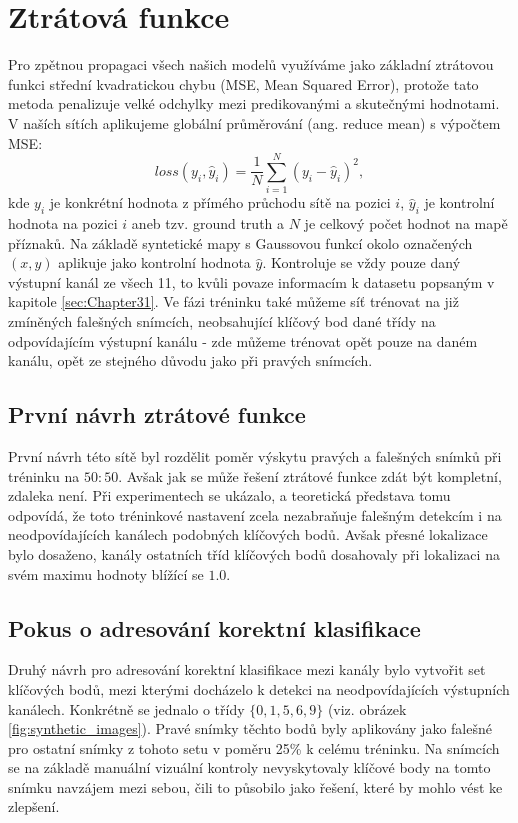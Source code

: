 \section{Ztrátová funkce}
\label{sec:Chapter47}
Pro zpětnou propagaci všech našich modelů využíváme jako základní ztrátovou funkci střední kvadratickou chybu (MSE, Mean Squared Error), protože tato metoda penalizuje velké odchylky mezi predikovanými a skutečnými hodnotami.  V naších sítích aplikujeme globální průměrování (ang. reduce mean) s výpočtem MSE:
\begin{equation}
    loss(y_i, \hat{y}_i) = \frac{1}{N} \sum_{i=1}^{N} (y_i - \hat{y}_i)^2,
\end{equation}
kde $y_i$ je konkrétní hodnota z přímého průchodu sítě na pozici $i$, $\hat{y}_i$ je kontrolní hodnota na pozici $i$ aneb tzv. ground truth a $N$ je celkový počet hodnot na mapě příznaků. Na základě syntetické mapy s Gaussovou funkcí okolo označených $(x, y)$ aplikuje jako kontrolní hodnota $\hat{y}$. Kontroluje se vždy pouze daný výstupní kanál ze všech 11, to kvůli povaze informacím k datasetu popsaným v kapitole \ref{sec:Chapter31}. Ve fázi tréninku také můžeme síť trénovat na již zmíněných falešných snímcích, neobsahující klíčový bod dané třídy na odpovídajícím výstupní kanálu - zde můžeme trénovat opět pouze na daném kanálu, opět ze stejného důvodu jako při pravých snímcích.

\subsection{První návrh ztrátové funkce}

První návrh této sítě byl rozdělit poměr výskytu pravých a falešných snímků při tréninku na $50:50$. Avšak jak se může řešení ztrátové funkce zdát být kompletní, zdaleka není. Při experimentech se ukázalo, a teoretická představa tomu odpovídá, že toto tréninkové nastavení zcela nezabraňuje falešným detekcím i na neodpovídajících kanálech podobných klíčových bodů. Avšak přesné lokalizace bylo dosaženo, kanály ostatních tříd klíčových bodů dosahovaly při lokalizaci na svém maximu hodnoty blížící se $1.0$.

\subsection{Pokus o adresování korektní klasifikace}

Druhý návrh pro adresování korektní klasifikace mezi kanály bylo vytvořit set klíčových bodů, mezi kterými docházelo k detekci na neodpovídajících výstupních kanálech. Konkrétně se jednalo o třídy $\{0, 1, 5, 6, 9\}$ (viz. obrázek \ref{fig:synthetic_images}). Pravé snímky těchto bodů byly aplikovány jako falešné pro ostatní snímky z tohoto setu v poměru 25\% k celému tréninku. Na snímcích se na základě manuální vizuální kontroly nevyskytovaly klíčové body na tomto snímku navzájem mezi sebou, čili to působilo jako řešení, které by mohlo vést ke zlepšení.

